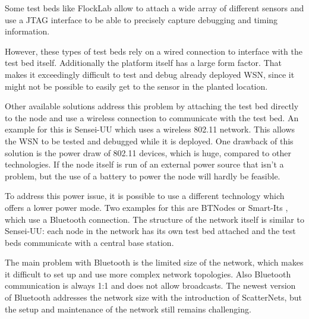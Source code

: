Some test beds like FlockLab \cite{Lim2013} allow to attach a wide array of different sensors and use a JTAG interface to be able to precisely capture debugging and timing information.

However, these types of test beds rely on a wired connection to interface with the test bed itself. Additionally the platform itself has a large form factor. That makes it exceedingly difficult to test and debug already deployed WSN, since it might not be possible to easily get to the sensor in the planted location.

Other available solutions address this problem by attaching the test bed directly to the node and use a wireless connection to communicate with the test bed. An example for this is Sensei-UU \cite{Rensfelt2009} which uses a wireless 802.11 network. This allows the WSN to be tested and debugged while it is deployed. One drawback of this solution is the power draw of 802.11 devices, which is huge, compared to other technologies. If the node itself is run of an external power source that isn't a problem, but the use of a battery to power the node will hardly be feasible.

To address this power issue, it is possible to use a different technology which offers a lower power mode. Two examples for this are BTNodes \cite{Moser} or Smart-Its \cite{Kasten2000}, which use a Bluetooth connection. 
The structure of the network itself is similar to Sensei-UU: each node in the network has its own test bed attached and the test beds communicate with a central base station.

The main problem with Bluetooth is the limited size of the network, which makes it difficult to set up and use more complex network topologies. Also Bluetooth communication is always 1:1 and does not allow broadcasts. The newest version of Bluetooth addresses the network size with the introduction of ScatterNets, but the setup and maintenance of the network still remains challenging.